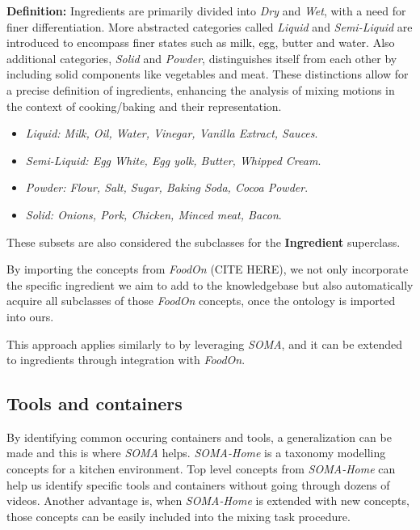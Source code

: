 \textbf{Definition:}
Ingredients are primarily divided into \textit{Dry} and \textit{Wet}, with a need for finer differentiation. More abstracted categories called \textit{Liquid} and \textit{Semi-Liquid} are introduced to encompass finer states such as milk, egg, butter and water. Also additional categories, \textit{Solid} and \textit{Powder}, distinguishes itself from each other by including solid components like vegetables and meat. These distinctions allow for a precise definition of ingredients, enhancing the analysis of mixing motions in the context of cooking/baking and their representation.

\begin{itemize}
    \item \textit{Liquid: Milk, Oil, Water, Vinegar, Vanilla Extract, Sauces}.
    \item \textit{Semi-Liquid: Egg White, Egg yolk, Butter, Whipped Cream}.
    \item \textit{Powder: Flour, Salt, Sugar, Baking Soda, Cocoa Powder}.
    \item \textit{Solid: Onions, Pork, Chicken, Minced meat, Bacon}.
  \end{itemize}

These subsets are also considered the subclasses for the \textbf{Ingredient} superclass.

By importing the concepts from \textit{FoodOn} (CITE HERE), we not only incorporate the specific ingredient we aim to add to the knowledgebase but also automatically acquire all subclasses of those \textit{FoodOn} concepts, once the ontology is imported into ours. 

This approach applies similarly to  by leveraging \textit{SOMA}, and it can be extended to ingredients through integration with \textit{FoodOn}.


\subsection{Tools and containers}
\label{sec:toolsandcontainers}

By identifying common occuring containers and tools, 
a generalization can be made and this is where \textit{SOMA} helps. \textit{SOMA-Home} is a taxonomy modelling concepts for a kitchen environment.
Top level concepts from \textit{SOMA-Home} can help us identify specific tools and containers without going through dozens of videos. 
Another advantage is, when \textit{SOMA-Home} is extended with new concepts, those concepts can be easily included into the mixing task procedure. 

